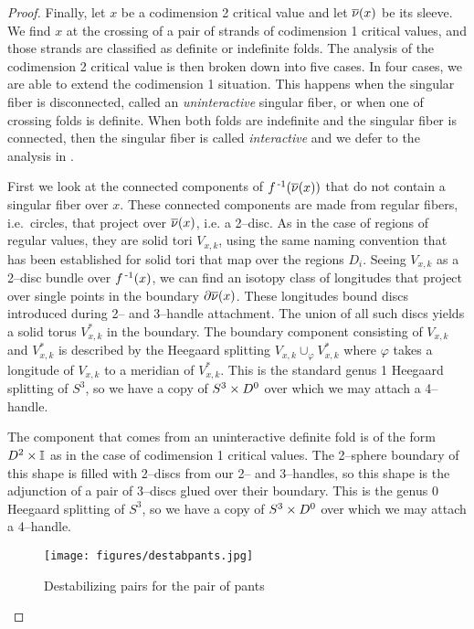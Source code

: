 \begin{proof}
	Finally, let $x$ be a codimension 2 critical value and let $\overline{\nu}(x)$ be its sleeve.
	We find $x$ at the crossing of a pair of strands of codimension 1 critical values, and those strands are classified as definite or indefinite folds.
	The analysis of the codimension 2 critical value is then broken down into five cases.
	In four cases, we are able to extend the codimension 1 situation.
	This happens when the singular fiber is disconnected, called an \emph{uninteractive} singular fiber, or when one of crossing folds is definite.
	When both folds are indefinite and the singular fiber is connected, then the singular fiber is called \emph{interactive} and we defer to the analysis in \cite{CostThur08}.
	
	First we look at the connected components of $f^{\,\text{-}1}(\overline{\nu}(x))$ that do not contain a singular fiber over $x$.
	These connected components are made from regular fibers, i.e.\ circles, that project over $\overline{\nu}(x)$, i.e. a 2--disc.
	As in the case of regions of regular values, they are solid tori $V_{x,k}$, using the same naming convention that has been established for solid tori that map over the regions $D_i$.
	Seeing $V_{x,k}$ as a 2--disc bundle over $f^{\,\text{-}1}(x)$, we can find an isotopy class of longitudes that project over single points in the boundary $\partial\overline{\nu}(x)$.
	These longitudes bound discs introduced during 2-- and 3--handle attachment.
	The union of all such discs yields a solid torus $V_{x,k}^*$ in the boundary.
	The boundary component consisting of $V_{x,k}$ and $V_{x,k}^*$ is described by the Heegaard splitting $V_{x,k}\cup_\varphi V_{x,k}^*$ where $\varphi$ takes a longitude of $V_{x,k}$ to a meridian of $V_{x,k}^*$.
	This is the standard genus 1 Heegaard splitting of $S^3$, so we have a copy of $S^3\times D^0$ over which we may attach a 4--handle.

	The component that comes from an uninteractive definite fold is of the form $D^2\times\mathbb{I}$ as in the case of codimension 1 critical values.
	The 2--sphere boundary of this shape is filled with 2--discs from our 2-- and 3--handles, so this shape is the adjunction of a pair of 3--discs glued over their boundary.
	This is the genus 0 Heegaard splitting of $S^3$, so we have a copy of $S^3\times D^0$ over which we may attach a 4--handle.
		
	\begin{figure}
		\centering
		\caption{Destabilizing pairs for the pair of pants}
		\texttt{[image: figures/destabpants.jpg]}
		\label{fig:destabpants}
	\end{figure}
		

\end{proof}
